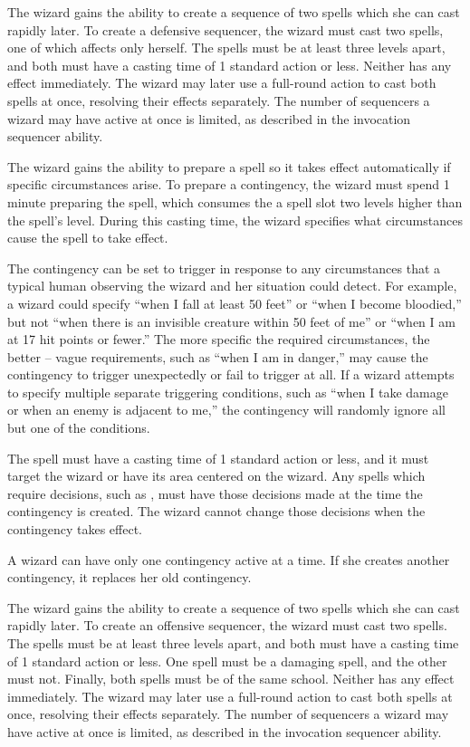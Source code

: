  The wizard gains the ability to create a sequence of two spells which she can cast rapidly later. To create a defensive sequencer, the wizard must cast two spells, one of which affects only herself. The spells must be at least three levels apart, and both must have a casting time of 1 standard action or less. Neither has any effect immediately. The wizard may later use a full-round action to cast both spells at once, resolving their effects separately. The number of sequencers a wizard may have active at once is limited, as described in the invocation sequencer ability.

 The wizard gains the ability to prepare a spell so it takes effect automatically if specific circumstances arise. To prepare a contingency, the wizard must spend 1 minute preparing the spell, which consumes the a spell slot two levels higher than the spell's level. During this casting time, the wizard specifies what circumstances cause the spell to take effect.

The contingency can be set to trigger in response to any circumstances that a typical human observing the wizard and her situation could detect. For example, a wizard could specify ``when I fall at least 50 feet'' or ``when I become bloodied,'' but not ``when there is an invisible creature within 50 feet of me'' or ``when I am at 17 hit points or fewer.'' The more specific the required circumstances, the better -- vague requirements, such as ``when I am in danger,'' may cause the contingency to trigger unexpectedly or fail to trigger at all. If a wizard attempts to specify multiple separate triggering conditions, such as ``when I take damage or when an enemy is adjacent to me,'' the contingency will randomly ignore all but one of the conditions.

The spell must have a casting time of 1 standard action or less, and it must target the wizard or have its area centered on the wizard. Any spells which require decisions, such as , must have those decisions made at the time the contingency is created. The wizard cannot change those decisions when the contingency takes effect.

A wizard can have only one contingency active at a time. If she creates another contingency, it replaces her old contingency.

 The wizard gains the ability to create a sequence of two spells which she can cast rapidly later. To create an offensive sequencer, the wizard must cast two spells. The spells must be at least three levels apart, and both must have a casting time of 1 standard action or less. One spell must be a damaging spell, and the other must not. Finally, both spells must be of the same school. Neither has any effect immediately. The wizard may later use a full-round action to cast both spells at once, resolving their effects separately. The number of sequencers a wizard may have active at once is limited, as described in the invocation sequencer ability.

